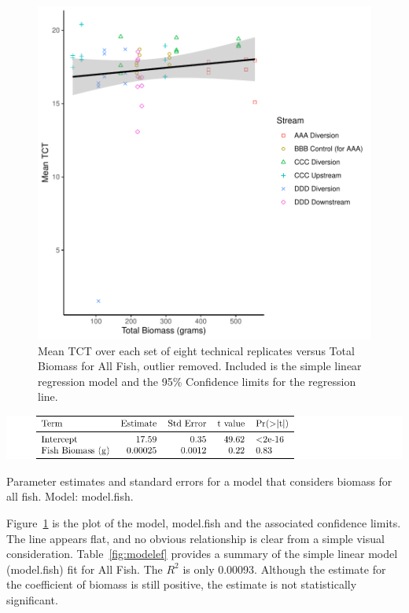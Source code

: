 \begin{figure}[H]
\includegraphics{Chapter5Images/gg_ef.pdf}
\caption{ \hspace{1mm} Mean TCT over each set of eight technical replicates versus Total Biomass for All Fish, outlier removed. Included is the simple linear regression model and the 95\% Confidence limits for the regression line.}
\label{fig:efanalysis}
\end{figure}


\begin{table}[H]
\includegraphics{Chapter5Images/eflinearfield.pdf}
\caption{Parameter estimates and standard errors for a model that considers biomass for all fish. Model: model.fish.}
\label{fig:modelef}
\end{table}


 Figure~\ref{fig:efanalysis} is the plot of the model, model.fish and the associated confidence limits. The line appears flat, and no obvious relationship is clear from a simple visual consideration. Table~\ref{fig:modelef} provides a summary of the simple linear model (model.fish) fit for All Fish. The $R^{2}$ is only 0.00093. Although the estimate for the coefficient of biomass is still positive, the estimate is not statistically significant. 


